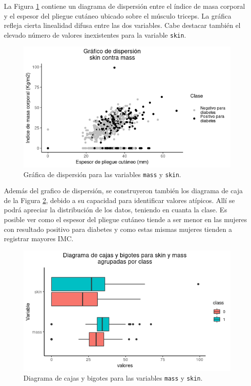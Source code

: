 \documentclass[11pt,letterpaper]{article}
\begin{document}
La Figura \ref{fig:figure-01} contiene un diagrama de dispersión entre el índice de masa corporal y el espesor del pliegue cutáneo ubicado sobre el músculo triceps. La gráfica refleja cierta linealidad difusa entre las dos variables. Cabe destacar también el elevado número de valores inexistentes para la variable {\tt skin}.


\begin{figure}[h]
\centering
\includegraphics[scale=0.7]{scatter0.png}
\caption{Gráfica de dispersión para las variables {\tt mass} y {\tt skin}.}
\label{fig:figure-01}
\end{figure}

Además del grafico de dispersión, se construyeron también los diagrama de caja de la Figura \ref{fig:figure-02}, debido a su capacidad para identificar valores atípicos. Allí se podrá apreciar la distribución de los datos, teniendo en cuanta la clase. Es posible ver como el espesor del pliegue cutáneo tiende a ser menor en las mujeres con resultado positivo para diabetes y como estas mismas mujeres tienden  a registrar mayores IMC.

\begin{figure}
\centering
\includegraphics[scale=0.6]{boxplot0.png}
\caption{Diagrama de cajas y bigotes para las variables {\tt mass} y {\tt skin}.}
\label{fig:figure-02} 
\end{figure}
\end{document}
